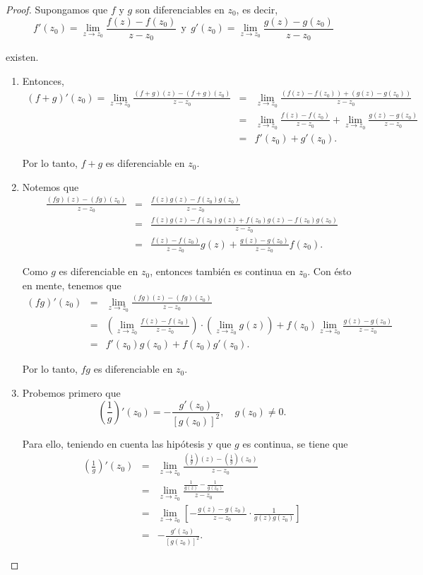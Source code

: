 \begin{proof}
Supongamos que $f$ y $g$ son diferenciables en $z_0$, es decir,
$$f'(z_0) =\lim_{z \to z_0}\frac{f(z) -f(z_0)}{z-z_0} ~~\mbox{y}~~ g'(z_0) = \lim_{z \to z_0}\frac{g(z) -g(z_0)}{z-z_0} $$

existen.

\begin{enumerate}
\item Entonces,
\begin{eqnarray*}
(f+g)'(z_0) = \lim_{z \to z_0}\frac{(f+g)(z) -(f+g)(z_0)}{z-z_0} &=&  \lim_{z \to z_0}\frac{(f(z) - f(z_0)) + (g(z) - g(z_0))}{z-z_0} \\
&=& \lim_{z \to z_0}\frac{f(z) - f(z_0)}{z-z_0}  + \lim_{z \to z_0}\frac{g(z) -g(z_0)}{z-z_0} \\
&=& f'(z_0) + g'(z_0).
\end{eqnarray*}

Por lo tanto, $f+g$ es diferenciable en $z_0$.

\item Notemos que 
\begin{eqnarray*}
\frac{(fg)(z) - (fg)(z_0)}{z-z_0} &=& \frac{f(z)g(z) - f(z_0)g(z_0)}{z-z_0} \\
&=& \frac{f(z)g(z) - f(z_0) g(z) + f(z_0)g(z) - f(z_0)g(z_0)}{z-z_0} \\
&=& \frac{f(z) - f(z_0)}{z-z_0} g(z) + \frac{g(z) - g(z_0)}{z-z_0} f(z_0).
\end{eqnarray*}

Como $g$ es diferenciable en $z_0$, entonces también es continua en $z_0$. Con ésto en mente, tenemos que
\begin{eqnarray*}
(fg)'(z_0) &=& \lim_{z \to z_0}\frac{(fg)(z) - (fg)(z_0)}{z-z_0} \\
&=& \left( \lim_{z \to z_0}\frac{f(z) -f(z_0)}{z-z_0} \right)\cdot \left( \lim_{z \to z_0} g(z) \right) + f(z_0) \lim_{z \to z_0}\frac{g(z) - g(z_0)}{z-z_0} \\
&=& f'(z_0) g(z_0) + f(z_0) g'(z_0).
\end{eqnarray*}

Por lo tanto, $fg$ es diferenciable en $z_0$.

\item Probemos primero que
$$\left( \frac{1}{g} \right)'(z_0) = - \frac{g'(z_0)}{[g(z_0)]^2}, \quad g(z_0) \neq 0.$$

Para ello, teniendo en cuenta las hipótesis y que $g$ es continua, se tiene que
\begin{eqnarray*}
\left( \frac{1}{g} \right)'(z_0) &=& \lim_{z \to z_0} \frac{\left( \frac{1}{g} \right)(z) - \left(  \frac{1}{g}\right)(z_0)}{z-z_0} \\
&=& \lim_{z \to z_0} \frac{\frac{1}{g(z)} -   \frac{1}{g(z_0)}}{z-z_0} \\
&=& \lim_{z \to z_0} \left[ - \frac{g(z) - g(z_0)}{z-z_0} \cdot \frac{1}{g(z)g(z_0)} \right] \\
&=&  - \frac{g'(z_0)}{[g(z_0)]^2}.
\end{eqnarray*}


\end{enumerate}
\end{proof}
